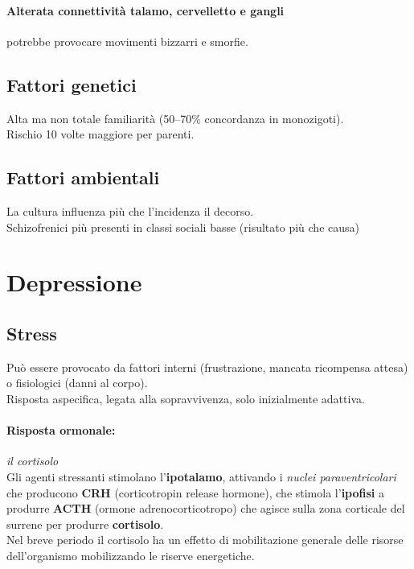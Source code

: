 \documentclass[12pt, a4paper]{article}
\begin{document}
\paragraph{Alterata connettività talamo, cervelletto e gangli}  potrebbe provocare movimenti bizzarri e smorfie.

\subsection{Fattori genetici} 

Alta ma non totale familiarità (50--70\% concordanza in monozigoti).\\
Rischio 10 volte maggiore per parenti.

\subsection{Fattori ambientali} 

La cultura influenza più che l'incidenza il decorso.\\
Schizofrenici più presenti in classi sociali basse (risultato più che causa)

\section{Depressione}

\subsection{Stress} 

Può essere provocato da fattori interni (frustrazione, mancata ricompensa attesa) o fisiologici (danni al corpo).
\medskip\\ 
Risposta aspecifica, legata alla sopravvivenza, solo inizialmente adattiva.
\paragraph{Risposta ormonale:} \emph{il cortisolo} \\ 
Gli agenti stressanti stimolano l'\textbf{ipotalamo}, attivando i \emph{nuclei paraventricolari} che producono \textbf{CRH} (corticotropin release hormone), che stimola l'\textbf{ipofisi} a produrre \textbf{ACTH} (ormone adrenocorticotropo) che agisce sulla zona corticale del surrene per produrre \textbf{cortisolo}. 
\medskip\\ 
Nel breve periodo il cortisolo ha un effetto di mobilitazione generale delle risorse dell'organismo mobilizzando le riserve energetiche.
\end{document}
